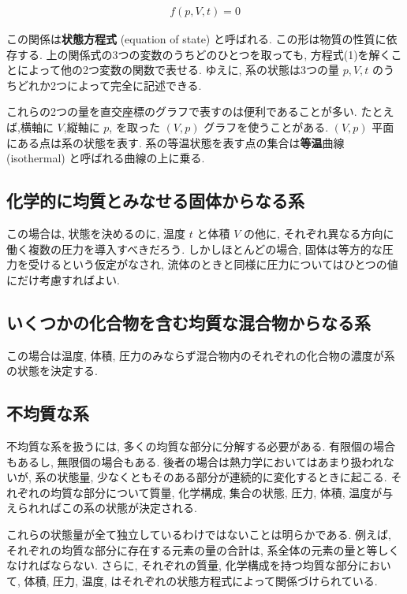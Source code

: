 \begin{align}\tag{1}
 f(p,V,t)=0
\end{align}

この関係は\textbf{状態方程式} (equation of state) と呼ばれる. この形は物質の性質に依存する. 上の関係式の3つの変数のうちどのひとつを取っても, 方程式(1)を解くことによって他の2つ変数の関数で表せる. ゆえに, 系の状態は3つの量 $p,V,t$ のうちどれか2つによって完全に記述できる.\par
これらの2つの量を直交座標のグラフで表すのは便利であることが多い. たとえば,横軸に $V$,縦軸に $p$, を取った $(V,p)$ グラフを使うことがある. $(V,p)$ 平面にある点は系の状態を表す. 系の等温状態を表す点の集合は\textbf{等温}曲線 (isothermal) と呼ばれる曲線の上に乗る.

\subsection*{化学的に均質とみなせる固体からなる系}
この場合は, 状態を決めるのに, 温度 $t$ と体積 $V$ の他に, それぞれ異なる方向に働く複数の圧力を導入すべきだろう. しかしほとんどの場合, 固体は等方的な圧力を受けるという仮定がなされ, 流体のときと同様に圧力についてはひとつの値にだけ考慮すればよい.

\subsection*{いくつかの化合物を含む均質な混合物からなる系}
この場合は温度, 体積, 圧力のみならず混合物内のそれぞれの化合物の濃度が系の状態を決定する.

\subsection*{不均質な系}
不均質な系を扱うには, 多くの均質な部分に分解する必要がある. 有限個の場合もあるし, 無限個の場合もある. 後者の場合は熱力学においてはあまり扱われないが, 系の状態量, 少なくともそのある部分が連続的に変化するときに起こる. それぞれの均質な部分について質量, 化学構成, 集合の状態, 圧力, 体積, 温度が与えられればこの系の状態が決定される. \par
これらの状態量が全て独立しているわけではないことは明らかである. 例えば, それぞれの均質な部分に存在する元素の量の合計は, 系全体の元素の量と等しくなければならない. さらに, それぞれの質量, 化学構成を持つ均質な部分において, 体積, 圧力, 温度, はそれぞれの状態方程式によって関係づけられている. 

